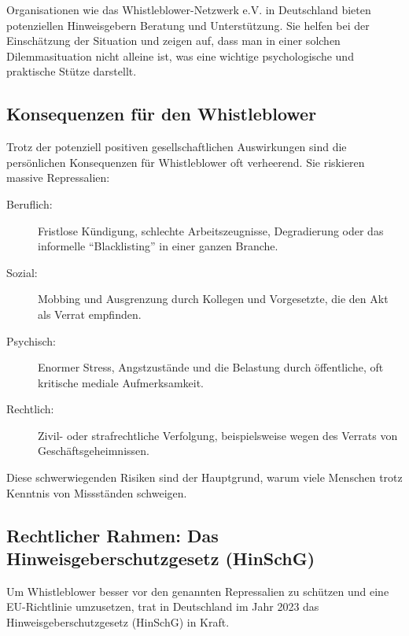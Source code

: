 \documentclass[
    12pt,               %
    a4paper,            %
    ngerman             %
]{scrartcl}
\begin{document}
Organisationen wie das Whistleblower-Netzwerk e.V. in Deutschland bieten potenziellen Hinweisgebern Beratung und Unterstützung. Sie helfen bei der Einschätzung der Situation und zeigen auf, dass man in einer solchen Dilemmasituation nicht alleine ist, was eine wichtige psychologische und praktische Stütze darstellt.

\par\noindent %

\subsection{Konsequenzen für den Whistleblower}
Trotz der potenziell positiven gesellschaftlichen Auswirkungen sind die persönlichen Konsequenzen für Whistleblower oft verheerend. Sie riskieren massive Repressalien:
\begin{description}
    \item[Beruflich:] Fristlose Kündigung, schlechte Arbeitszeugnisse, Degradierung oder das informelle \enquote{Blacklisting} in einer ganzen Branche.
    \item[Sozial:] Mobbing und Ausgrenzung durch Kollegen und Vorgesetzte, die den Akt als Verrat empfinden.
    \item[Psychisch:] Enormer Stress, Angstzustände und die Belastung durch öffentliche, oft kritische mediale Aufmerksamkeit.
    \item[Rechtlich:] Zivil- oder strafrechtliche Verfolgung, beispielsweise wegen des Verrats von Geschäftsgeheimnissen.
\end{description}
Diese schwerwiegenden Risiken sind der Hauptgrund, warum viele Menschen trotz Kenntnis von Missständen schweigen.

\subsection{Rechtlicher Rahmen: Das Hinweisgeberschutzgesetz (HinSchG)}
Um Whistleblower besser vor den genannten Repressalien zu schützen und eine EU-Richtlinie umzusetzen, trat in Deutschland im Jahr 2023 das Hinweisgeberschutzgesetz (HinSchG) in Kraft.
\end{document}
